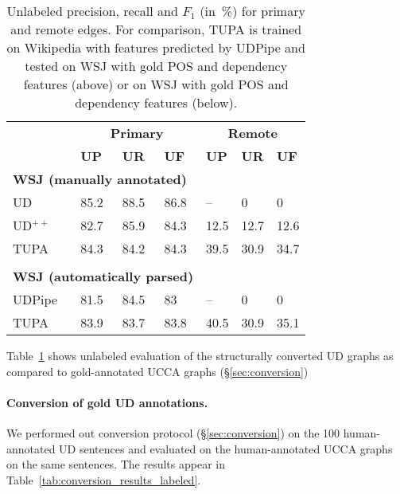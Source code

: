 \documentclass[11pt,a4paper]{article}
\begin{document}
\begin{table}[t]
\centering
\begin{tabular}{l|lll|lll}
& \multicolumn{3}{c|}{\footnotesize \bf Primary} & \multicolumn{3}{c}{\footnotesize \bf Remote} \\
& \footnotesize \textbf{UP} & \footnotesize \textbf{UR} & \footnotesize \textbf{UF}
& \footnotesize \textbf{UP} & \footnotesize \textbf{UR} & \footnotesize \textbf{UF} \\
\hline
\multicolumn{4}{l|}{\small \bf WSJ (manually annotated)} & \\
\footnotesize UD
& 85.2 & 88.5 & 86.8 & -- & 0 & 0 \\
\footnotesize UD$^{++}$
& 82.7 & 85.9 & 84.3 & 12.5 & 12.7 & 12.6 \\
\footnotesize TUPA
& 84.3 & 84.2 & 84.3 & 39.5 & 30.9 & 34.7 \\
\\
\multicolumn{4}{l|}{\small \bf WSJ (automatically parsed)} & \\
UDPipe & 81.5 & 84.5 & 83 & -- & 0 & 0 \\
\footnotesize TUPA
& 83.9 & 83.7 & 83.8 & 40.5 & 30.9 & 35.1
\end{tabular}
\caption{
Unlabeled precision, recall and $F_1$ (in~\%) for primary and remote edges.
For comparison, TUPA \protect\cite{hershcovich2017a} is trained on Wikipedia with features predicted by UDPipe
and tested on WSJ with gold POS and dependency features (above)
or on WSJ with gold POS and dependency features (below).
\label{tab:conversion_results_unlabeled}}
\end{table}

Table~\ref{tab:conversion_results_unlabeled} shows unlabeled evaluation of the
structurally converted UD graphs as compared to gold-annotated UCCA graphs (\S\ref{sec:conversion})


\paragraph{Conversion of gold UD annotations.}

We performed out conversion protocol (\S\ref{sec:conversion}) on the 100 human-annotated UD sentences
and evaluated on the human-annotated UCCA graphs on the same sentences.
The results appear in Table~\ref{tab:conversion_results_labeled}.
\end{document}
